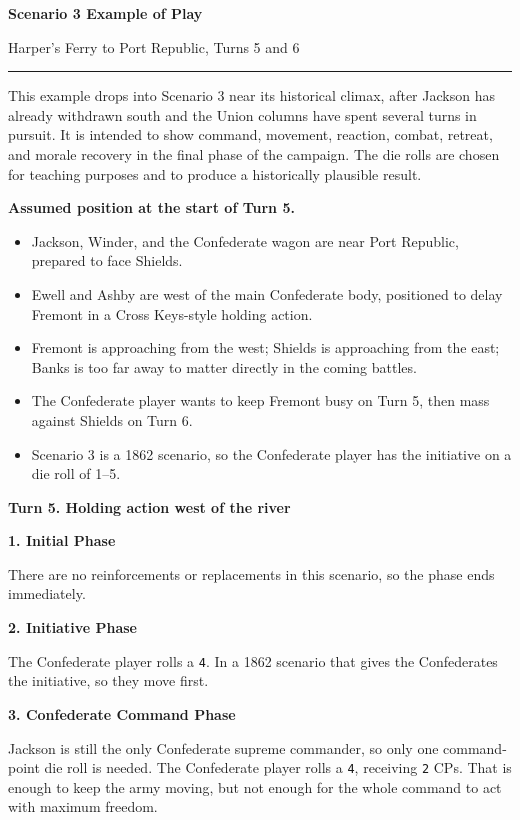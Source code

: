 \documentclass[11pt]{article}
\begin{document}
{\LARGE\bfseries Scenario 3 Example of Play\par}
{\large Harper's Ferry to Port Republic, Turns 5 and 6\par}
\vspace{0.25em}
\color{titleline}\rule{\textwidth}{1.2pt}\par
\vspace{0.45em}

This example drops into Scenario 3 near its historical climax, after Jackson has already withdrawn south and the Union columns have spent several turns in pursuit. It is intended to show command, movement, reaction, combat, retreat, and morale recovery in the final phase of the campaign. The die rolls are chosen for teaching purposes and to produce a historically plausible result.

\textbf{Assumed position at the start of Turn 5.}

\begin{itemize}
\item Jackson, Winder, and the Confederate wagon are near Port Republic, prepared to face Shields.
\item Ewell and Ashby are west of the main Confederate body, positioned to delay Fremont in a Cross Keys-style holding action.
\item Fremont is approaching from the west; Shields is approaching from the east; Banks is too far away to matter directly in the coming battles.
\item The Confederate player wants to keep Fremont busy on Turn 5, then mass against Shields on Turn 6.
\item Scenario 3 is a 1862 scenario, so the Confederate player has the initiative on a die roll of 1--5.
\end{itemize}

\textbf{Turn 5. Holding action west of the river}

\textbf{1. Initial Phase}

There are no reinforcements or replacements in this scenario, so the phase ends immediately.

\textbf{2. Initiative Phase}

The Confederate player rolls a \texttt{4}. In a 1862 scenario that gives the Confederates the initiative, so they move first.

\textbf{3. Confederate Command Phase}

Jackson is still the only Confederate supreme commander, so only one command-point die roll is needed. The Confederate player rolls a \texttt{4}, receiving \texttt{2} CPs. That is enough to keep the army moving, but not enough for the whole command to act with maximum freedom.
\end{document}
